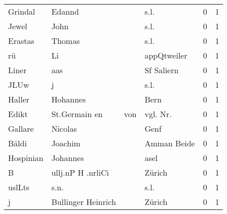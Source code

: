 \begin{center}
\begin{tiny}
\begin{longtabu}{llllrr}
                  Grindal &                             Edannd &             &                                        s.l. &          0 &         1 \\
                    Jewel &                               John &             &                                        s.l. &          0 &         1 \\
                  Erastas &                             Thomas &             &                                        s.l. &          0 &         1 \\
                       rü &                                 Li &             &                                 appQtweiler &          0 &         1 \\
                    Liner &                                aas &             &                                  Sf Saliern &          0 &         1 \\
                     JLUw &                                  j &             &                                        s.l. &          0 &         1 \\
                   Haller &                           Hohannes &             &                                        Bern &          0 &         1 \\
                    Edikt &                      St.Germain en &         von &                                   vgl. Nr.  &          0 &         1 \\
                  Gallare &                            Nicolas &             &                                        Genf &          0 &         1 \\
                    Bäldi &                            Joachim &             &                                 Amman Beide &          0 &         1 \\
                Hospinian &                           Johannes &             &                                        asel &          0 &         1 \\
                        B &                  ullj.nP H .nrliCi &             &                                      Zürich &          0 &         1 \\
                   uslLts &                               s.n. &             &                                        s.l. &          0 &         1 \\
                        j &                 Bullinger Heinrich &             &                                      Zürich &          0 &         1 \\

\end{longtabu}
\end{tiny}
\end{center}
